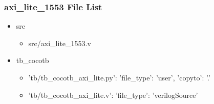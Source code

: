 \subsubsection{axi\_lite\_1553 File List}
\begin{itemize}
\item src
	\begin{itemize}
	\item src/axi\_lite\_1553.v
	\end{itemize}
\item tb\_cocotb
	\begin{itemize}
	\item {'tb/tb\_cocotb\_axi\_lite.py': {'file\_type': 'user', 'copyto': '.'}}
	\item {'tb/tb\_cocotb\_axi\_lite.v': {'file\_type': 'verilogSource'}}
	\end{itemize}
\end{itemize}
